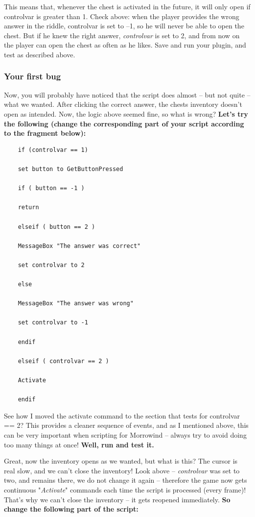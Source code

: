 This means that, whenever the chest is activated in the future, it will only open if controlvar is greater than 1. Check above: when the player provides the wrong answer in the riddle, controlvar is set to --1, so he will never be able to open the chest. But if he knew the right answer, \emph{controlvar} is set to 2, and from now on the player can open the chest as often as he likes. Save and run your plugin, and test as described above.

\hypertarget{your-first-bug}{%
\subsubsection{Your first bug}\label{your-first-bug}}

Now, you will probably have noticed that the script does almost -- but not quite -- what we wanted. After clicking the correct answer, the chests inventory doesn't open as intended. Now, the logic above seemed fine, so what is wrong? \textbf{Let's try the following (change the corresponding part of your script according to the fragment below):}


\begin{lstlisting}
	if (controlvar == 1)
	
	set button to GetButtonPressed
	
	if ( button == -1 )
	
	return
	
	elseif ( button == 2 )
	
	MessageBox "The answer was correct"
	
	set controlvar to 2
	
	else
	
	MessageBox "The answer was wrong"
	
	set controlvar to -1
	
	endif
	
	elseif ( controlvar == 2 )
	
	Activate
	
	endif
\end{lstlisting}

See how I moved the activate command to the section that tests for controlvar == 2? This provides a cleaner sequence of events, and as I mentioned above, this can be very important when scripting for Morrowind -- always try to avoid doing too many things at once! \textbf{Well, run and test it.}

Great, now the inventory opens as we wanted, but what is this? The cursor is real slow, and we can't close the inventory! Look above -- \emph{controlvar} was set to two, and remains there, we do not change it again -- therefore the game now gets continuous "\emph{Activate}" commands each time the script is processed (every frame)! That's why we can't close the inventory -- it gets reopened immediately. \textbf{So change the following part of the script:}

